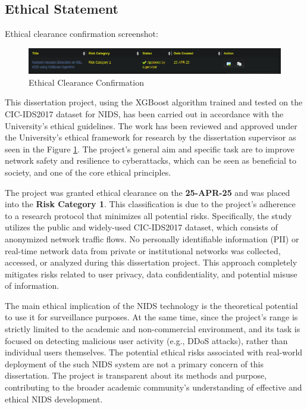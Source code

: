 \subsection{Ethical Statement}
Ethical clearance confirmation screenshot:
\begin{figure}[H]
	\centering
	\includegraphics[width=1\textwidth]{assets/figures/ethics.png}
	\caption{Ethical Clearance Confirmation}
	\label{fig:ethical_clearance}
\end{figure}

This dissertation project, using the XGBoost algorithm trained and tested on the CIC-IDS2017 dataset for NIDS, 
has been carried out in accordance with the University's ethical guidelines. The work has been reviewed and approved under 
the University's ethical framework for research by the dissertation supervisor as seen in the Figure \ref{fig:ethical_clearance}. The project's general aim and specific task are to improve network safety and 
resilience to cyberattacks, which can be seen as beneficial to society, and one of the core ethical principles.

The project was granted ethical clearance on the \textbf{25-APR-25} and was placed into the \textbf{Risk Category 1}. This 
classification is due to the project's adherence to a research protocol that minimizes all potential risks. Specifically, 
the study utilizes the public and widely-used CIC-IDS2017 dataset, which consists of anonymized network traffic flows. No
personally identifiable information (PII) or real-time network data from private or institutional networks was collected, 
accessed, or analyzed during this dissertation project. This approach completely mitigates risks related to user privacy, 
data confidentiality, and potential misuse of information.

The main ethical implication of the NIDS technology is the theoretical potential to use it for surveillance purposes. At the same 
time, since the project's range is strictly limited to the academic and non-commercial environment, and its task is focused on 
detecting malicious user activity (e.g., DDoS attacks), rather than individual users themselves. The potential ethical risks 
associated with real-world deployment of the such NIDS system are not a primary concern of this dissertation. The project is 
transparent about its methods and purpose, contributing to the broader academic community's understanding of effective and 
ethical NIDS development.